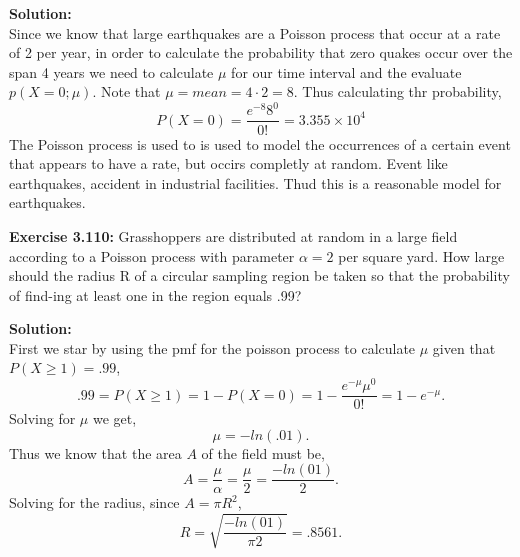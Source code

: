\documentclass[12pt]{article}
\theoremstyle{homework}
\newcommand{\localhead}[1]{\par\smallskip\noindent\textbf{#1}\nobreak\\}%
\newcommand\solution{\localhead{Solution:}}
\begin{document}
\solution Since we know that large earthquakes are a Poisson process that occur at a rate of 2 per year, in order
to calculate the probability that zero quakes occur over the span 4 years we need to calculate $\mu$ for our time interval and the 
evaluate $p(X = 0; \mu)$. Note that $\mu = mean = 4\cdot 2 = 8$. Thus calculating thr probability,
\begin{equation*}
  P(X = 0) = \dfrac{e^{-8}8^{0}}{0!} = 3.355 \times 10^4
\end{equation*}
The Poisson process is used to is used to model the occurrences of a certain event that appears to have a rate, but occirs completly at random. Event like earthquakes, accident in industrial facilities. Thud this is a reasonable model for earthquakes. 
\vspace{.5in}





\hspace{.5in}\textbf{Exercise 3.110:} Grasshoppers  are  distributed  at  random  in  a  large  field  according to a Poisson process with parameter $\alpha = 2$ per square yard. How large should the radius R of a circular sampling region be taken so that the probability of find-ing at least one in the region equals .99?\\

\solution 

First we star by using the pmf for the poisson process to calculate $\mu$ given that $P(X \geq 1) = .99$,
\begin{equation}
  .99 = P(X \geq 1) = 1 - P(X = 0) = 1 - \dfrac{e^{-\mu}\mu^0}{0!} = 1 - e^{-\mu}.
\end{equation}
Solving for $\mu$ we get,
\begin{equation*}
  \mu = -ln(.01).
\end{equation*}
Thus we know that the area $A$ of the field must be,
\begin{equation*}
  A = \dfrac{\mu}{\alpha} = \dfrac{\mu}{2} =  \dfrac{-ln(01)}{2}.
\end{equation*}
Solving for the radius, since $A = \pi R^2$,\\
\begin{equation*}
  R = \sqrt{\dfrac{-ln(01)}{\pi2}} = .8561.
\end{equation*}

\vspace{.5in}
\end{document}
